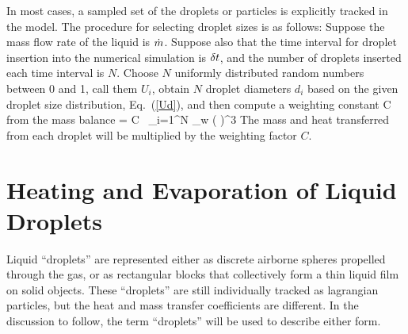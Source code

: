 In most cases, a sampled set of the droplets or particles is explicitly tracked in the model.
The procedure for selecting droplet sizes is as follows:
Suppose the mass flow rate of the liquid is $\dot{m}$.
Suppose also that the time interval for droplet insertion
into the numerical simulation is $\delta t$, and the number of droplets
inserted each time interval is $N$. Choose $N$ uniformly distributed random
numbers between 0 and 1, call them $U_i$,
obtain $N$ droplet diameters $d_i$ based on the
given droplet size distribution, Eq.~(\ref{Ud}), and then compute
a weighting constant C from the mass balance
\be \dm \; \dt = C \, \sum_{i=1}^N \;   \pi \rho_w
      \left(  \right)^3 \ee
The mass and heat transferred from each droplet will be multiplied by
the weighting factor $C$.



\clearpage

\section{Heating and Evaporation of Liquid Droplets}

Liquid ``droplets'' are represented either as discrete airborne spheres propelled through the gas,
or as rectangular blocks that collectively form a thin liquid film on solid objects.
These ``droplets'' are still individually tracked as
lagrangian particles, but the heat and mass transfer coefficients are different.
In the discussion to follow, the term ``droplets'' will be used to describe either form.


